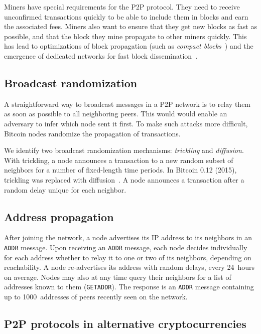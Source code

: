 Miners have special requirements for the P2P protocol.
They need to receive unconfirmed transactions quickly to be able to include them in blocks and earn the associated fees.
Miners also want to ensure that they get new blocks as fast as possible, and that the block they mine propagate to other miners quickly.
This has lead to optimizations of block propagation (such as \textit{compact blocks}~\cite{Core2016}) and the emergence of dedicated networks for fast block dissemination~\cite{FALCON, FIBRE}.


\subsection{Broadcast randomization}

A straightforward way to broadcast messages in a P2P network is to relay them as soon as possible to all neighboring peers.
This would would enable an adversary to infer which node sent it first.
To make such attacks more difficult, Bitcoin nodes randomize the propagation of transactions.

We identify two broadcast randomization mechanisms: \textit{trickling} and \textit{diffusion}.
With trickling, a node announces a transaction to a new random subset of neighbors for a number of fixed-length time periods.
In Bitcoin 0.12 (2015), trickling was replaced with diffusion~\cite{Wuille}.
A node announces a transaction after a random delay unique for each neighbor.

\subsection{Address propagation}

After joining the network, a node advertises its IP address to its neighbors in an \texttt{ADDR} message.
Upon receiving an \texttt{ADDR} message, each node decides individually for each address whether to relay it to one or two of its neighbors, depending on reachability.
A node re-advertises its address with random delays, every 24~hours on average.
Nodes may also at any time query their neighbors for a list of addresses known to them (\texttt{GETADDR}).
The response is an \texttt{ADDR} message containing up to 1000~addresses of peers recently seen on the network.


\subsection{P2P protocols in alternative cryptocurrencies}

